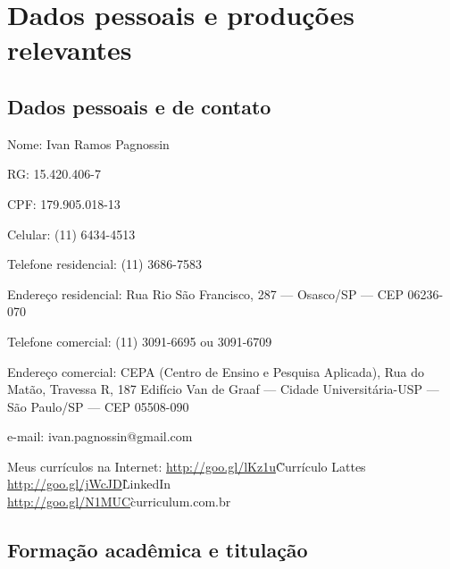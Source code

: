 \chapter{Dados pessoais e produções relevantes}
\label{cap:resumo}

\section*{Dados pessoais e de contato}

\begin{compactdesc}
	\item[Nome:] Ivan Ramos Pagnossin
	\item[RG:] 15.420.406-7
	\item[CPF:] 179.905.018-13
	\item[Celular:] (11) 6434-4513
	\item[Telefone residencial:] (11) 3686-7583
	\item[Endereço residencial:] Rua Rio São Francisco, 287 --- Osasco/SP --- CEP 06236-070
	\item[Telefone comercial:] (11) 3091-6695 ou 3091-6709
	\item[Endereço comercial:] CEPA (Centro de Ensino e Pesquisa Aplicada), Rua do Matão, Travessa R, 187
Edifício Van de Graaf --- Cidade Universitária-USP --- São Paulo/SP --- CEP 05508-090
	\item[e-mail:] ivan.pagnossin@gmail.com
\end{compactdesc}

\begin{tabbing}
Meus currículos na Internet: \=\url{http://goo.gl/lKz1u}\`Currículo Lattes\\
														 \>\url{http://goo.gl/jWcJD}\`LinkedIn\\
														 \>\url{http://goo.gl/N1MUC}\`curriculum.com.br
\end{tabbing}

\section*{Formação acadêmica e titulação}

